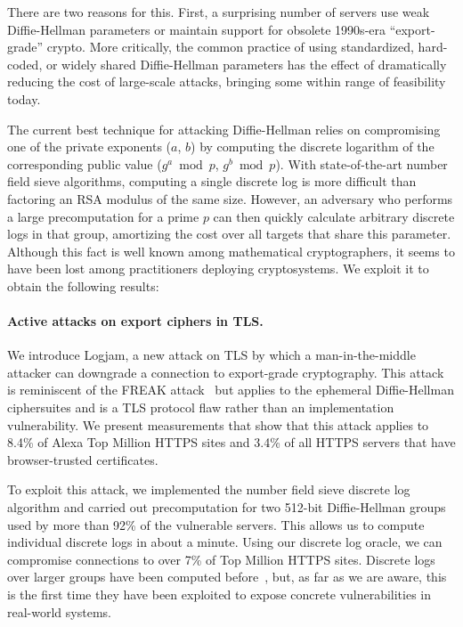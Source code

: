 There are two reasons for this. First, a surprising number of servers use
weak Diffie-Hellman parameters or maintain support for obsolete 1990s-era
``export-grade'' crypto. More critically, the common practice of using
standardized, hard-coded, or widely shared Diffie-Hellman parameters has the
effect of dramatically reducing the cost of large-scale attacks, bringing
some within range of feasibility today.

The current best technique for attacking Diffie-Hellman relies on
compromising one of the private exponents ($a$, $b$) by computing the
discrete logarithm of the corresponding public value ($g^a \bmod p$, $g^b
\bmod p$). With state-of-the-art number field sieve algorithms, computing a
single discrete log is more difficult than factoring an RSA modulus of the
same size. However, an adversary who performs a large precomputation for a
prime $p$ can then quickly calculate arbitrary discrete logs in that group,
amortizing the cost over all targets that share this parameter. Although this
fact is well known among mathematical cryptographers, it seems to have been
lost among practitioners deploying cryptosystems. We exploit it to
obtain the following results:

\paragraph{Active attacks on export ciphers in TLS\@.}
We introduce Logjam, a new attack on TLS by which a man-in-the-middle
attacker can downgrade a connection to export-grade cryptography. This attack
is reminiscent of the FREAK attack~\cite{tls-state-of-the-union-2015} but
applies to the ephemeral Diffie-Hellman ciphersuites and is a TLS protocol
flaw rather than an implementation vulnerability. We present measurements
that show that this attack applies to 8.4\% of Alexa Top Million HTTPS sites
and 3.4\% of all HTTPS servers that have browser-trusted certificates.

To exploit this attack, we implemented the number field sieve discrete log
algorithm and carried out precomputation for two 512-bit Diffie-Hellman
groups used by more than 92\% of the vulnerable servers. This allows us to
compute individual discrete logs in about a minute. Using our discrete log
oracle, we can compromise connections to over 7\% of Top Million HTTPS sites.
Discrete logs over larger groups have been computed before~\cite{dlp180},
but, as far as we are aware, this is the first time they have been exploited
to expose concrete vulnerabilities in real-world systems.


